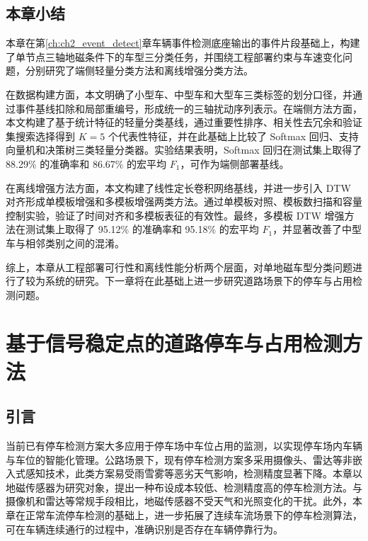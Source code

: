 \documentclass{xdupgthesis}
\begin{document}
\section{本章小结}
\label{sec:ch3_summary}

本章在第\ref{ch:ch2_event_detect}章车辆事件检测底座输出的事件片段基础上，构建了单节点三轴地磁条件下的车型三分类任务，并围绕工程部署约束与车速变化问题，分别研究了端侧轻量分类方法和离线增强分类方法。

在数据构建方面，本文明确了小型车、中型车和大型车三类标签的划分口径，并通过事件基线扣除和局部重编号，形成统一的三轴扰动序列表示。在端侧方法方面，本文构建了基于统计特征的轻量分类基线，通过重要性排序、相关性去冗余和验证集搜索选择得到 $K=5$ 个代表性特征，并在此基础上比较了 Softmax 回归、支持向量机和决策树三类轻量分类器。实验结果表明，Softmax 回归在测试集上取得了 88.29\% 的准确率和 86.67\% 的宏平均 $F_1$，可作为端侧部署基线。

在离线增强方法方面，本文构建了线性定长卷积网络基线，并进一步引入 DTW 对齐形成单模板增强和多模板增强两类方法。通过单模板对照、模板数扫描和容量控制实验，验证了时间对齐和多模板表征的有效性。最终，多模板 DTW 增强方法在测试集上取得了 95.12\% 的准确率和 95.18\% 的宏平均 $F_1$，并显著改善了中型车与相邻类别之间的混淆。

综上，本章从工程部署可行性和离线性能分析两个层面，对单地磁车型分类问题进行了较为系统的研究。下一章将在此基础上进一步研究道路场景下的停车与占用检测问题。





\chapter{基于信号稳定点的道路停车与占用检测方法}
\label{ch:ch4_parking}

\section{引言}
\label{sec:ch4_intro}

当前已有停车检测方案大多应用于停车场中车位占用的监测，以实现停车场内车辆与车位的智能化管理\cite{R46}。公路场景下，现有停车检测方案多采用摄像头、雷达等非嵌入式感知技术，此类方案易受雨雪雾等恶劣天气影响，检测精度显著下降。本章以地磁传感器为研究对象，提出一种布设成本较低、检测精度高的停车检测方法。与摄像机和雷达等常规手段相比，地磁传感器不受天气和光照变化的干扰。此外，本章在正常车流停车检测的基础上，进一步拓展了连续车流场景下的停车检测算法，可在车辆连续通行的过程中，准确识别是否存在车辆停靠行为。
\end{document}
